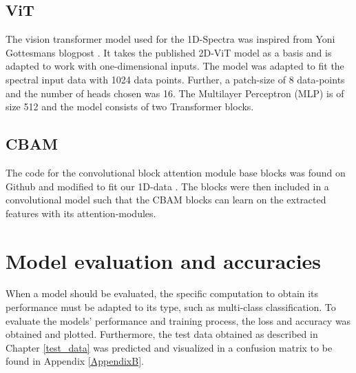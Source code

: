 

\subsection{ViT}
The vision transformer model used for the 1D-Spectra was inspired from Yoni Gottesmans blogpost \cite{noauthor_interpretable_2023}. It takes the published 2D-ViT model  as a basis and is adapted to work with one-dimensional inputs.
The model was adapted to fit the spectral input data with 1024 data points. Further, a patch-size of 8 data-points and the number of heads chosen was 16.
The Multilayer Perceptron (MLP) is of size 512 and the model consists of two Transformer blocks.




\subsection{CBAM}
The code for the convolutional block attention module base blocks was found on Github and modified to fit our 1D-data \cite{mazzia__2023}.
The blocks were then included in a convolutional model such that the CBAM blocks can learn on the extracted features with its attention-modules.



\section{Model evaluation and accuracies}

When a model should be evaluated, the specific computation to obtain its performance must be adapted to its type, such as multi-class classification. 
To evaluate the models' performance and training process, the loss and accuracy was obtained and plotted. Furthermore, the test data obtained as described in Chapter \ref{test_data} was predicted and visualized in a confusion matrix to be found in Appendix \ref{AppendixB}.
